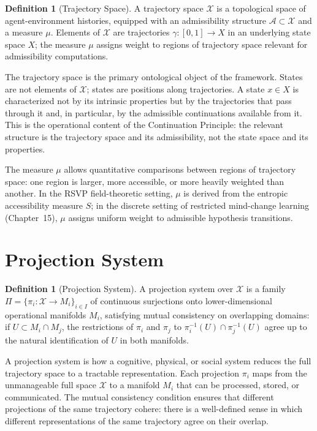 \documentclass[12pt, oneside]{book}
\theoremstyle{flyxion}
\theoremstyle{definition}
\newtheorem{definition}[theorem]{Definition}
\begin{document}
\begin{definition}[Trajectory Space]
A trajectory space $\mathcal{X}$ is a topological space of
agent-environment histories, equipped with an admissibility
structure $\mathcal{A} \subset \mathcal{X}$ and a measure
$\mu$. Elements of $\mathcal{X}$ are trajectories
$\gamma : [0,1] \to X$ in an underlying state space $X$;
the measure $\mu$ assigns weight to regions of trajectory
space relevant for admissibility computations.
\end{definition}

The trajectory space is the primary ontological object of the
framework. States are not elements of $\mathcal{X}$; states
are positions along trajectories. A state $x \in X$ is
characterized not by its intrinsic properties but by the
trajectories that pass through it and, in particular, by
the admissible continuations available from it. This is the
operational content of the Continuation Principle: the
relevant structure is the trajectory space and its
admissibility, not the state space and its properties.

The measure $\mu$ allows quantitative comparisons between
regions of trajectory space: one region is larger, more
accessible, or more heavily weighted than another. In the
RSVP field-theoretic setting, $\mu$ is derived from the
entropic accessibility measure $S$; in the discrete setting
of restricted mind-change learning (Chapter~15), $\mu$
assigns uniform weight to admissible hypothesis transitions.

\section{Projection System}

\begin{definition}[Projection System]
A projection system over $\mathcal{X}$ is a family
$\Pi = \{\pi_i : \mathcal{X} \to M_i\}_{i \in I}$ of
continuous surjections onto lower-dimensional operational
manifolds $M_i$, satisfying mutual consistency on overlapping
domains: if $U \subset M_i \cap M_j$, the restrictions of
$\pi_i$ and $\pi_j$ to $\pi_i^{-1}(U) \cap \pi_j^{-1}(U)$
agree up to the natural identification of $U$ in both
manifolds.
\end{definition}

A projection system is how a cognitive, physical, or social
system reduces the full trajectory space to a tractable
representation. Each projection $\pi_i$ maps from the
unmanageable full space $\mathcal{X}$ to a manifold $M_i$
that can be processed, stored, or communicated. The mutual
consistency condition ensures that different projections of
the same trajectory cohere: there is a well-defined sense
in which different representations of the same trajectory
agree on their overlap.
\end{document}
